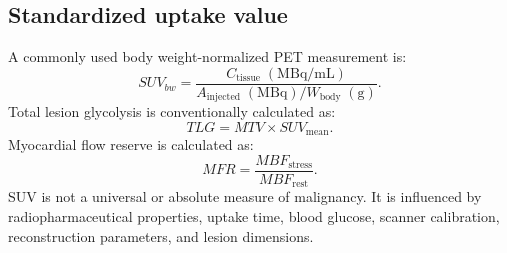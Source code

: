 \subsection{Standardized uptake value}
A commonly used body weight-normalized PET measurement is:
\begin{equation}
SUV_{bw}=\frac{C_{\text{tissue}}\;(\mathrm{MBq/mL})}{A_{\text{injected}}\;(\mathrm{MBq})/W_{\text{body}}\;(\mathrm{g})}.
\end{equation}
Total lesion glycolysis is conventionally calculated as:
\begin{equation}
TLG=MTV\times SUV_{\text{mean}}.
\end{equation}
Myocardial flow reserve is calculated as:
\begin{equation}
MFR=\frac{MBF_{\text{stress}}}{MBF_{\text{rest}}}.
\end{equation}
SUV is not a universal or absolute measure of malignancy. It is influenced by radiopharmaceutical properties, uptake time, blood glucose, scanner calibration, reconstruction parameters, and lesion dimensions.

